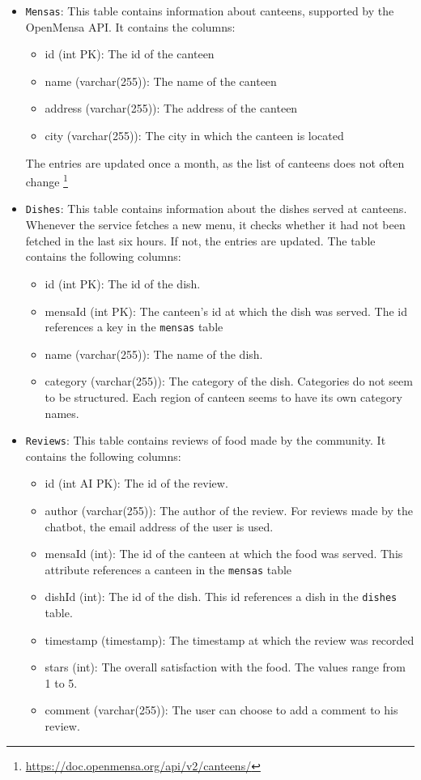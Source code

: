 \begin{itemize}
    \item \texttt{Mensas}: This table contains information about canteens, supported by the OpenMensa API. It contains the columns:
    \begin{itemize}
        \item id (int PK): The id of the canteen
        \item name (varchar(255)): The name of the canteen
        \item address (varchar(255)): The address of the canteen
        \item city (varchar(255)): The city in which the canteen is located 
    \end{itemize}
    The entries are updated once a month, as the list of canteens does not often change \footnote{\href{ OpenMensa API specification}{https://doc.openmensa.org/api/v2/canteens/}}
    \item \texttt{Dishes}: This table contains information about the dishes served at canteens. Whenever the service fetches a new menu, it checks whether it had not been fetched in the last six hours. If not, the entries are updated. The table contains the following columns:
    \begin{itemize}
        \item id (int PK): The id of the dish. 
        \item mensaId (int PK): The canteen's id at which the dish was served. The id references a key in the \texttt{mensas} table
        \item name (varchar(255)): The name of the dish.
        \item category (varchar(255)): The category of the dish. Categories do not seem to be structured. Each region of canteen seems to have its own category names.
    \end{itemize}
    \item \texttt{Reviews}: This table contains reviews of food made by the community. It contains the following columns:
    \begin{itemize}
        \item id (int AI PK): The id of the review.
        \item author (varchar(255)): The author of the review. For reviews made by the chatbot, the email address of the user is used.
        \item mensaId (int): The id of the canteen at which the food was served. This attribute references a canteen in the \texttt{mensas} table
        \item dishId (int): The id of the dish. This id references a dish in the \texttt{dishes} table.
        \item timestamp (timestamp): The timestamp at which the review was recorded
        \item stars (int): The overall satisfaction with the food. The values range from 1 to 5.
        \item comment (varchar(255)): The user can choose to add a comment to his review.
    \end{itemize}
\end{itemize}

